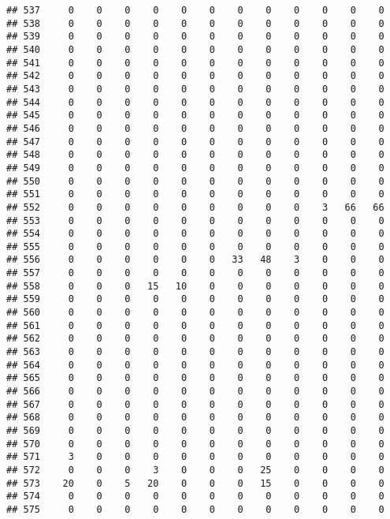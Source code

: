 \documentclass[]{article}
\begin{document}
\begin{verbatim}
## 537     0    0    0    0    0    0    0    0    0    0    0    0
## 538     0    0    0    0    0    0    0    0    0    0    0    0
## 539     0    0    0    0    0    0    0    0    0    0    0    0
## 540     0    0    0    0    0    0    0    0    0    0    0    0
## 541     0    0    0    0    0    0    0    0    0    0    0    0
## 542     0    0    0    0    0    0    0    0    0    0    0    0
## 543     0    0    0    0    0    0    0    0    0    0    0    0
## 544     0    0    0    0    0    0    0    0    0    0    0    0
## 545     0    0    0    0    0    0    0    0    0    0    0    0
## 546     0    0    0    0    0    0    0    0    0    0    0    0
## 547     0    0    0    0    0    0    0    0    0    0    0    0
## 548     0    0    0    0    0    0    0    0    0    0    0    0
## 549     0    0    0    0    0    0    0    0    0    0    0    0
## 550     0    0    0    0    0    0    0    0    0    0    0    0
## 551     0    0    0    0    0    0    0    0    0    0    0    0
## 552     0    0    0    0    0    0    0    0    0    3   66   66
## 553     0    0    0    0    0    0    0    0    0    0    0    0
## 554     0    0    0    0    0    0    0    0    0    0    0    0
## 555     0    0    0    0    0    0    0    0    0    0    0    0
## 556     0    0    0    0    0    0   33   48    3    0    0    0
## 557     0    0    0    0    0    0    0    0    0    0    0    0
## 558     0    0    0   15   10    0    0    0    0    0    0    0
## 559     0    0    0    0    0    0    0    0    0    0    0    0
## 560     0    0    0    0    0    0    0    0    0    0    0    0
## 561     0    0    0    0    0    0    0    0    0    0    0    0
## 562     0    0    0    0    0    0    0    0    0    0    0    0
## 563     0    0    0    0    0    0    0    0    0    0    0    0
## 564     0    0    0    0    0    0    0    0    0    0    0    0
## 565     0    0    0    0    0    0    0    0    0    0    0    0
## 566     0    0    0    0    0    0    0    0    0    0    0    0
## 567     0    0    0    0    0    0    0    0    0    0    0    0
## 568     0    0    0    0    0    0    0    0    0    0    0    0
## 569     0    0    0    0    0    0    0    0    0    0    0    0
## 570     0    0    0    0    0    0    0    0    0    0    0    0
## 571     3    0    0    0    0    0    0    0    0    0    0    0
## 572     0    0    0    3    0    0    0   25    0    0    0    0
## 573    20    0    5   20    0    0    0   15    0    0    0    0
## 574     0    0    0    0    0    0    0    0    0    0    0    0
## 575     0    0    0    0    0    0    0    0    0    0    0    0

\end{verbatim}
\end{document}

